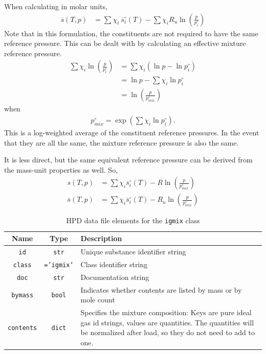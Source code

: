 When calculating in molar units,
\begin{align*}
\overline{s}(T,p) &= \sum \chi_i\ \overline{s}^\circ_i(T) - \sum \chi_i R_u \ln\left(\frac{p}{p^\circ_i}\right)
\end{align*}
Note that in this formulation, the constituents are not required to have the same reference pressure.  This can be dealt with by calculating an effective mixture reference pressure.  
\begin{align*}
\sum \chi_i \ln\left(\frac{p}{p^\circ_i}\right) &= \sum \chi_i \left( \ln p - \ln p^\circ_i \right)\\
&= \ln p - \sum \chi_i \ln p^\circ_i\\
&= \ln \left(\frac{p}{p^\circ_{mix}}\right)
\end{align*}
when
\begin{align}
p^\circ_{mix} = \exp\left(\sum \chi_i \ln p^\circ_i \right).
\end{align}
This is a log-weighted average of the constituent reference pressures.  In the event that they are all the same, the mixture reference pressure is also the same.

It is less direct, but the same equivalent reference pressure can be derived from the mass-unit properties as well.  So,
\begin{subequations}
\begin{align}
s(T,p) &= \sum \chi_i \overline{s}^\circ_i(T) - R \ln\left(\frac{p}{p^\circ_{mix}}\right)\\
\overline{s}(T,p) &= \sum \chi_i \overline{s}^\circ_i(T) - R_u \ln\left(\frac{p}{p^\circ_{mix}}\right)
\end{align}
\end{subequations}

\begin{table}
\centering
\caption{HPD data file elements for the \texttt{igmix} class}\label{tab:class:igmix}
\begin{tabular}{|ccp{2.5in}|}
\hline
Name & Type & Description\\
\hline
\texttt{id} & \texttt{str} & Unique substance identifier string\\
\texttt{class} & \texttt{='igmix'} & Class identifier string\\
\texttt{doc} & \texttt{str} & Documentation string\\
\hline
\texttt{bymass} & \texttt{bool} & Indicates whether contents are listed by mass or by mole count\\
\texttt{contents} & \texttt{dict} & Specifies the mixture composition: Keys are pure ideal gas id strings, values are quantities.  The quantities will be normalized after load, so they do not need to add to one.\\
\hline
\end{tabular}
\end{table}

